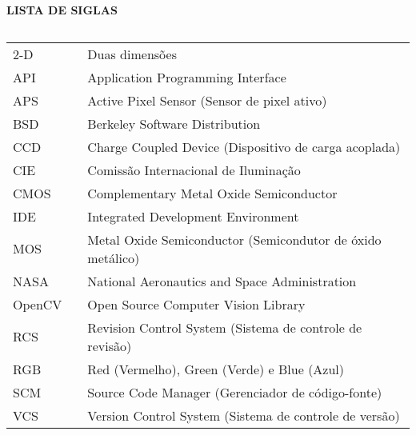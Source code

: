 \newpage

\begin{center}
\textbf{LISTA DE SIGLAS}
\end{center}
$\!$\\

\begin{tabular}{lll}
2-D & \hspace{1cm} & Duas dimensões \\

API & \hspace{1cm} & Application Programming Interface\\

APS & \hspace{1cm} & Active Pixel Sensor (Sensor de pixel ativo) \\

BSD & \hspace{1cm} & Berkeley Software Distribution \\

CCD & \hspace{1cm} & Charge Coupled Device (Dispositivo de carga acoplada) \\

CIE & \hspace{1cm} & Comissão Internacional de Iluminação \\

CMOS & \hspace{1cm} & Complementary Metal Oxide Semiconductor \\

IDE & \hspace{1cm} & Integrated Development Environment \\

MOS & \hspace{1cm} & Metal Oxide Semiconductor (Semicondutor de óxido metálico) \\

NASA & \hspace{1cm} & National Aeronautics and Space Administration \\

OpenCV & \hspace{1cm} & Open Source Computer Vision Library \\

RCS & \hspace{1cm} & Revision Control System (Sistema de controle de revisão) \\

RGB & \hspace{1cm} & Red (Vermelho), Green (Verde) e Blue (Azul) \\

SCM & \hspace{1cm} & Source Code Manager (Gerenciador de código-fonte) \\

VCS & \hspace{1cm} & Version Control System (Sistema de controle de versão) \\

\end{tabular}